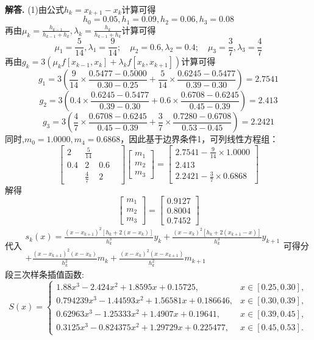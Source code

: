 \documentclass[12pt, a4paper, oneside]{ctexart}
\newenvironment{solution}{\par\noindent\textbf{解答. }}{\par}
\begin{document}
\begin{solution}
(1)由公式$h_k=x_{k+1}-x_k$计算可得
\[
    h_0=0.05,h_1=0.09,h_2=0.06,h_3=0.08
\]
再由$\mu_k=\frac{h_{k-1}}{h_{k-1}+h_k},\lambda_k=\frac{h_k}{h_{k-1}+h_k}$计算可得
\[  
    \mu_1=\frac{5}{14},\lambda_1=\frac{9}{14};\quad \mu_2=0.6,\lambda_2=0.4;\quad \mu_3=\frac{3}{7},\lambda_3=\frac{4}{7}
\]
再由$g_k=3(\mu_kf[x_{k-1},x_k]+\lambda_kf[x_k,x_{k+1}])$计算可得
\[
    g_1=3\left(\frac{9}{14}\times\frac{0.5477-0.5000}{0.30-0.25}+\frac{5}{14}\times\frac{0.6245-0.5477}{0.39-0.30}\right)=2.7541
\]
\[
    g_2=3\left(0.4\times\frac{0.6245-0.5477}{0.39-0.30}+0.6\times\frac{0.6708-0.6245}{0.45-0.39}\right)=2.413
\]
\[
    g_3=3\left(\frac{4}{7}\times\frac{0.6708-0.6245}{0.45-0.39}+\frac{3}{7}\times\frac{0.7280-0.6708}{0.53-0.45}\right)=2.2421
\]
同时,$m_0=1.0000,m_4=0.6868$，因此基于边界条件1，可列线性方程组：
\[
\begin{bmatrix}2&\frac{5}{14}&&\\0.4&2&0.6&\\&\frac{4}{7}&2&\end{bmatrix}\begin{bmatrix}m_1\\m_2\\m_3\end{bmatrix}=\begin{bmatrix}2.7541-\frac{9}{14}\times 1.0000\\2.413\\2.2421-\frac{3}{7}\times0.6868\end{bmatrix}
\]
解得
\[
\begin{bmatrix}m_1\\m_2\\m_3\end{bmatrix}=\begin{bmatrix}0.9127\\0.8004\\0.7452\end{bmatrix}
\]
代入$\begin{gathered}s_k(x)=\frac{(x-x_{k+1})^2[h_k+2(x-x_k)]}{h_k^3}y_k+\frac{(x-x_k)^2[h_k+2(x_{k+1}-x)]}{h_k^3}y_{k+1}\\+\frac{(x-x_{k+1})^2(x-x_k)}{h_k^2}m_k+\frac{(x-x_k)^2(x-x_{k+1})}{h_k^2}m_{k+1}\end{gathered}$可得分段三次样条插值函数:
\[S(x)=
\begin{cases}
1.88 x^3 - 2.424 x^2 + 1.8595 x + 0.15725, & x\in[0.25,0.30],\\
0.794239 x^3 - 1.44593 x^2 + 1.56581 x + 0.186646, & x\in[0.30,0.39],\\
0.62963 x^3 - 1.25333 x^2 + 1.4907 x + 0.19641, & x\in[0.39,0.45],\\
0.3125 x^3 - 0.824375 x^2 + 1.29729 x + 0.225477, & x\in[0.45,0.53].
\end{cases}\]


\end{solution}
\end{document}
